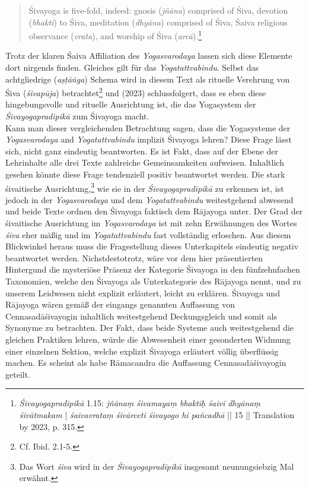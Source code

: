 \begin{quote}
  Śivayoga is five-fold, indeed: gnosis (\textit{jñāna}) comprised of Śiva, devotion (\textit{bhakti}) to Śiva,
meditation (\textit{dhyāna}) comprised of Śiva, Śaiva religious observance (\textit{vrata}), and worship of Śiva
(\textit{arcā}).\footnote{\textit{Śivayogapradīpikā} 1.15: \textit{jñānaṃ śivamayaṃ bhaktiḥ śaivī dhyānaṃ śivātmakam} | \textit{śaivavrataṃ śivārceti śivayogo hi pañcadhā} || 15 || Translation by \citeauthor{powell2023} 2023, p. 315.} 
  \end{quote}
  Trotz der klaren Śaiva Affiliation des \textit{Yogasvarodaya} lassen sich diese Elemente dort nirgends finden. Gleiches gilt für das \textit{Yogatattvabindu}. Selbst das achtgliedrige (\textit{aṣṭāṅga}) Schema wird in diesem Text als rituelle Verehrung von Śiva (\textit{śivapūja}) betrachtet\footnote{Cf. Ibid. 2.1-5.} und \citeauthor{powell2023} (2023) schlussfolgert, dass es eben diese hingebungsvolle und rituelle Ausrichtung ist, die das Yogasystem der \textit{Śivayogapradīpikā} zum Śivayoga macht.\\

  Kann man dieser vergleichenden Betrachtung sagen, dass die Yogasysteme der \textit{Yogasvarodaya} and \textit{Yogatattvabindu} implizit Śivayoga lehren? Diese Frage lässt sich, nicht ganz eindeutig beantworten. Es ist Fakt, dass auf der Ebene der Lehrinhalte alle drei Texte zahlreiche Gemeinsamkeiten aufweisen. Inhaltlich gesehen könnte diese Frage tendenziell positiv beantwortet werden. Die stark śivaitische Ausrichtung,\footnote{Das Wort \textit{śiva} wird in der \textit{Śivayogapradīpikā} insgesamt neunungsiebzig Mal erwähnt.} wie sie in der \textit{Śivayogapradīpikā} zu erkennen ist, ist jedoch in der \textit{Yogasvarodaya} und dem \textit{Yogatattvabindu} weitestgehend abwesend und beide Texte ordnen den Śivayoga faktisch dem Rājayoga unter. Der Grad der śivaitische Ausrichtung im \textit{Yogasvarodaya} ist mit zehn Erwähnungen des Wortes \textit{śiva} eher mäßig und im \textit{Yogatattvabindu} fast vollständig erloschen. Aus diesem Blickwinkel heraus muss die Fragestellung dieses Unterkapitels eindeutig negativ beantwortet werden. Nichstdestotrotz, wäre vor dem hier präsentierten Hintergund die mysteriöse Präsenz der Kategorie Śivayoga in den fünfzehnfachen Taxonomien, welche den Śivayoga als Unterkategorie des Rājayoga nennt, und zu unserem Leidwesen nicht explizit erläutert, leicht zu erklären. Śivayoga und Rājayoga wären gemäß der eingangs genannten Auffassung von Cennasadāśivayogin inhaltlich weitestgehend Deckungsgleich und somit als Synonyme zu betrachten. Der Fakt, dass beide Systeme auch weitestgehend die gleichen Praktiken lehren, würde die Abwesenheit einer gesonderten Widmung einer einzelnen Sektion, welche explizit Śivayoga erläutert völlig überflüssig machen. Es scheint als habe Rāmacandra die Auffassung Cennasadāśivayogin geteilt.        

